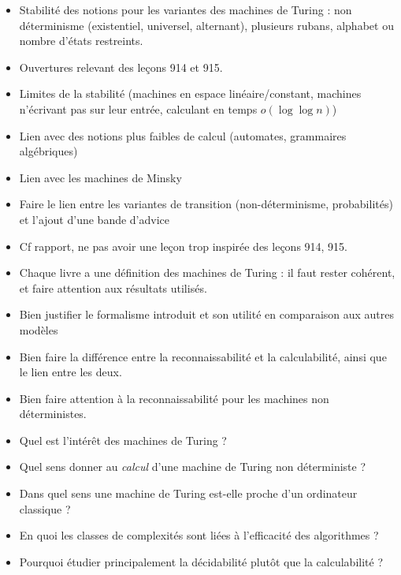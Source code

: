 \documentclass{agregfiche}
\begin{document}
\begin{itemize}
	\item Stabilité des notions pour les variantes des machines de Turing : non
	déterminisme (existentiel, universel, alternant), 
	plusieurs rubans, alphabet ou nombre d'états restreints.
	\item Ouvertures relevant des leçons 914 et 915.
	\item Limites de la stabilité (machines en espace linéaire/constant, 
	machines n'écrivant pas sur leur entrée,
	calculant en temps $o(\log \log n)$)
	\item Lien avec des notions plus faibles de calcul (automates, grammaires
	algébriques)
	\item Lien avec les machines de Minsky
	\item Faire le lien entre les variantes de transition (non-déterminisme,
	probabilités) et l'ajout d'une bande d'advice
\end{itemize}

\secpieges

\begin{itemize}
    \item Cf rapport, ne pas avoir une leçon trop inspirée des leçons 914, 915.
    \item Chaque livre a une définition des machines de Turing : il faut rester cohérent, et faire attention aux résultats utilisés.
    \item Bien justifier le formalisme introduit et son utilité en comparaison
        aux autres modèles
    \item Bien faire la différence entre la reconnaissabilité et la
        calculabilité, ainsi que le lien entre les deux.
    \item Bien faire attention à la reconnaissabilité pour les machines 
        non déterministes.
\end{itemize}

\secquestionsclassiques

\begin{itemize}
    \item Quel est l'intérêt des machines de Turing ?
    \item Quel sens donner au \emph{calcul} d'une machine de Turing non
        déterministe ?
    \item Dans quel sens une machine de Turing est-elle proche d'un ordinateur
        classique ?
    \item En quoi les classes de complexités sont liées à l'efficacité des
        algorithmes ?
    \item Pourquoi étudier principalement la décidabilité plutôt que la
        calculabilité ?
\end{itemize}
\end{document}
